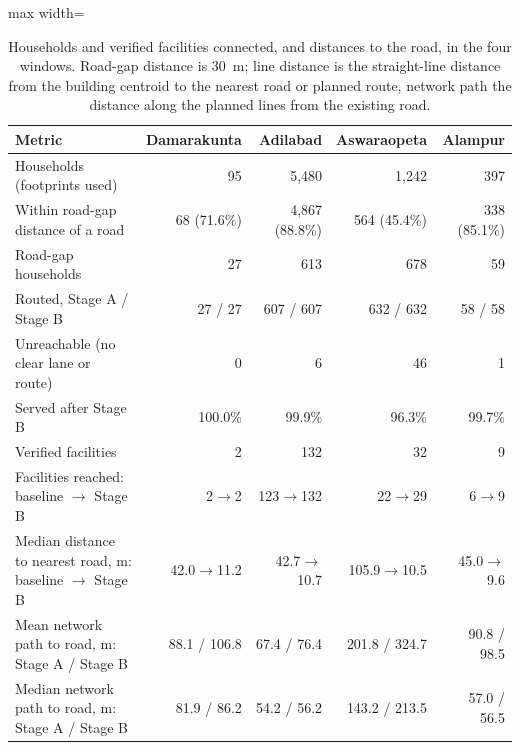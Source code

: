 \documentclass[preprint,12pt]{elsarticle}
\begin{document}
\begin{table}[htbp]
\caption{Households and verified facilities connected, and distances to the road, in the four windows. Road-gap distance is $30$~m; line distance is the straight-line distance from the building centroid to the nearest road or planned route, network path the distance along the planned lines from the existing road.}
\label{tab:access}
\centering
\footnotesize
\begin{adjustbox}{max width=\textwidth}
\begin{tabular}{@{}lrrrr@{}}
\toprule
Metric & Damarakunta & Adilabad & Aswaraopeta & Alampur\\
\midrule
Households (footprints used) & 95 & 5{,}480 & 1{,}242 & 397\\
Within road-gap distance of a road & 68 (71.6\%) & 4{,}867 (88.8\%) & 564 (45.4\%) & 338 (85.1\%)\\
Road-gap households & 27 & 613 & 678 & 59\\
Routed, Stage A / Stage B & 27 / 27 & 607 / 607 & 632 / 632 & 58 / 58\\
Unreachable (no clear lane or route) & 0 & 6 & 46 & 1\\
Served after Stage B & 100.0\% & 99.9\% & 96.3\% & 99.7\%\\
Verified facilities & 2 & 132 & 32 & 9\\
Facilities reached: baseline $\rightarrow$ Stage B & 2$\rightarrow$2 & 123$\rightarrow$132 & 22$\rightarrow$29 & 6$\rightarrow$9\\
Median distance to nearest road, m: baseline $\rightarrow$ Stage B & 42.0$\rightarrow$11.2 & 42.7$\rightarrow$10.7 & 105.9$\rightarrow$10.5 & 45.0$\rightarrow$9.6\\
Mean network path to road, m: Stage A / Stage B & 88.1 / 106.8 & 67.4 / 76.4 & 201.8 / 324.7 & 90.8 / 98.5\\
Median network path to road, m: Stage A / Stage B & 81.9 / 86.2 & 54.2 / 56.2 & 143.2 / 213.5 & 57.0 / 56.5\\
\bottomrule
\end{tabular}
\end{adjustbox}
\end{table}
\end{document}

